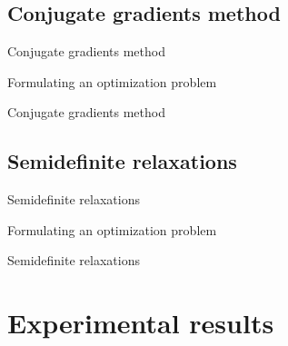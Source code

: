 \documentclass{beamer}
\theoremstyle{definition}
\theoremstyle{plain}
\theoremstyle{remark}
\begin{document}
		\subsection{Conjugate gradients method}
			\begin{frame}{Conjugate gradients method}
				\begin{block}{Formulating an optimization problem}
				\end{block}
			\end{frame}

			\begin{frame}{Conjugate gradients method}
				
			\end{frame}

		\subsection{Semidefinite relaxations}
			\begin{frame}{Semidefinite relaxations}
				\begin{block}{Formulating an optimization problem}
				\end{block}
			\end{frame}

			\begin{frame}{Semidefinite relaxations}
				
			\end{frame}

	\section{Experimental results}
		\begin{frame}{}
				
		\end{frame}
\end{document}
